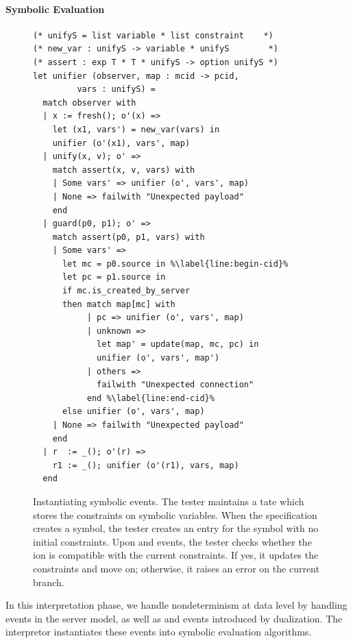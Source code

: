 \paragraph*{Symbolic Evaluation}

\begin{figure}
  \begin{lstlisting}[style=customcoq,numbers=right,escapechar=\%]
(* unifyS = list variable * list constraint    *)
(* new_var : unifyS -> variable * unifyS        *)
(* assert : exp T * T * unifyS -> option unifyS *)
let unifier (observer, map : mcid -> pcid,
         vars : unifyS) =
  match observer with
  | x := fresh(); o'(x) =>
    let (x1, vars') = new_var(vars) in
    unifier (o'(x1), vars', map)
  | unify(x, v); o' =>
    match assert(x, v, vars) with
    | Some vars' => unifier (o', vars', map)
    | None => failwith "Unexpected payload"
    end
  | guard(p0, p1); o' =>
    match assert(p0, p1, vars) with
    | Some vars' =>
      let mc = p0.source in %\label{line:begin-cid}%
      let pc = p1.source in
      if mc.is_created_by_server
      then match map[mc] with
           | pc => unifier (o', vars', map)
           | unknown =>
             let map' = update(map, mc, pc) in
             unifier (o', vars', map')
           | others =>
             failwith "Unexpected connection"
           end %\label{line:end-cid}%
      else unifier (o', vars', map)
    | None => failwith "Unexpected payload"
    end
  | r  := _(); o'(r) =>
    r1 := _(); unifier (o'(r1), vars, map)
  end
  \end{lstlisting}
  \caption{Instantiating symbolic events.  The tester maintains a tate
    which stores the constraints on symbolic variables.  When the
    specification creates a  symbol, the tester creates an entry for
    the symbol with no initial constraints.  Upon  and
     events, the tester checks whether the ion is
    compatible with the current constraints.  If yes, it updates the constraints
    and move on; otherwise, it raises an error on the current branch.
  }
  \label{fig:unifier}
\end{figure}

In this interpretation phase, we handle nondeterminism at data level by handling
 events in the server model, as well as  and 
events introduced by dualization.  The interpretor instantiates these events
into symbolic evaluation algorithms.

